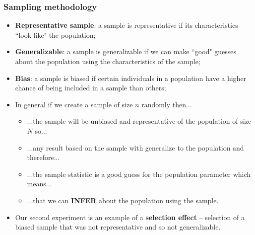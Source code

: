 \documentclass[aspectratio=169]{beamer}
\theoremstyle{principle}
\begin{document}
\begin{frame}
\frametitle{Sampling methodology}

\begin{itemize}
\item \textbf{Representative sample}: a sample is representative if its characteristics ``look like" the population;
\bigskip
\item \textbf{Generalizable}: a sample is generalizable if we can make ``good" guesses about the population using the characteristics of the sample;
\bigskip
\item \textbf{Bias}: a sample is biased if certain individuals in a population have a higher chance of being included in a sample than others;
\bigskip
\item In general if we create a sample of size $n$ randomly then...
\begin{itemize}
\item ...the sample will be unbiased and representative of the population of size $N$ so...
\item ...any result based on the sample with generalize to the population and therefore...
\item ...the sample statistic is a good guess for the population parameter which means...
\item ...that we can \textbf{INFER} about the population using the sample.
\end{itemize}
\bigskip
\item Our second experiment is an example of a \textbf{selection effect} -- selection of a biased sample that was not representative and so not generalizable.
\end{itemize}

\end{frame}
\end{document}
